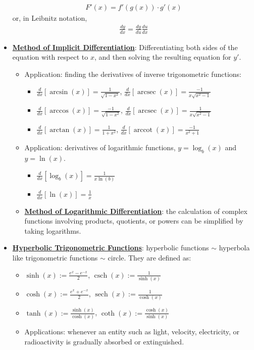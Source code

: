\documentclass[11pt]{article}
\newcommand{\dfn}[1]{\underline{\textbf{#1}}}
\newcommand{\deriv}[1]{\frac{d}{dx} \left[ #1 \right]}
\DeclareMathOperator{\arcsec}{arcsec}
\DeclareMathOperator{\arccot}{arccot}
\DeclareMathOperator{\csch}{csch}
\DeclareMathOperator{\sech}{sech}
\begin{document}
\begin{itemize}[noitemsep]
	\begin{align}
		F'(x) = f'(g(x)) \cdot g'(x)	
	\end{align}
	or, in Leibnitz notation, 
	\begin{align}
		\frac{dy}{dx} = \frac{dy}{du} \frac{du}{dx}	
	\end{align}
	\item \dfn{Method of Implicit Differentiation}: Differentiating both sides of the equation with respect to $x$, and then solving the resulting equation for $y'$. 
	\begin{itemize}[noitemsep]
		\item Application: finding the derivatives of inverse trigonometric functions: 
		\begin{itemize}[noitemsep]
			\item $\deriv{\arcsin(x)} = \frac{1}{\sqrt{1-x^2}}$, $\deriv{\arcsec(x)} = \frac{-1}{x \sqrt{x^2 - 1}}$
			\item $\deriv{\arccos(x)} = \frac{-1}{\sqrt{1-x^2}}$, $\deriv{\arcsec(x)} = \frac{1}{x \sqrt{x^2-1}}$ 
			\item $\deriv{\arctan(x)} = \frac{1}{1+x^2}$, $\deriv{\arccot(x)} = \frac{-1}{x^2 +1}$ 
		\end{itemize}
		\item Application: derivatives of logarithmic functions, $y = \log_b(x)$ and $y = \ln(x)$. 
		\begin{itemize}[noitemsep]
			\item $\deriv{ \log_b(x)} = \frac{1}{x \ln (b)}$
			\item $\deriv{ \ln (x) } = \frac{1}{x}$
		\end{itemize}
		\item \dfn{Method of Logarithmic Differentiation}: the calculation of complex functions involving products, quotients, or powers can be simplified by taking logarithms. 
	\end{itemize}
	\item \dfn{Hyperbolic Trigonometric Functions}: hyperbolic functions $\sim$ hyperbola like trigonometric functions $\sim$ circle. They are defined as: 
	\begin{itemize}[noitemsep]
		\item $\sinh(x) := \frac{e^x - e^{-x}}{2}$, $\csch(x) := \frac{1}{\sinh(x)}$
		\item $\cosh(x) := \frac{e^x + e^{-x}}{2}$, $\sech(x) := \frac{1}{\cosh(x)}$
		\item $\tanh(x) := \frac{\sinh(x)}{\cosh(x)}$, $\coth(x) := \frac{\cosh(x)}{\sinh(x)}$
		\item Applications: whenever an entity such as light, velocity, electricity, or radioactivity is gradually absorbed or extinguished. 

\end{itemize}
\end{itemize}
\end{document}
